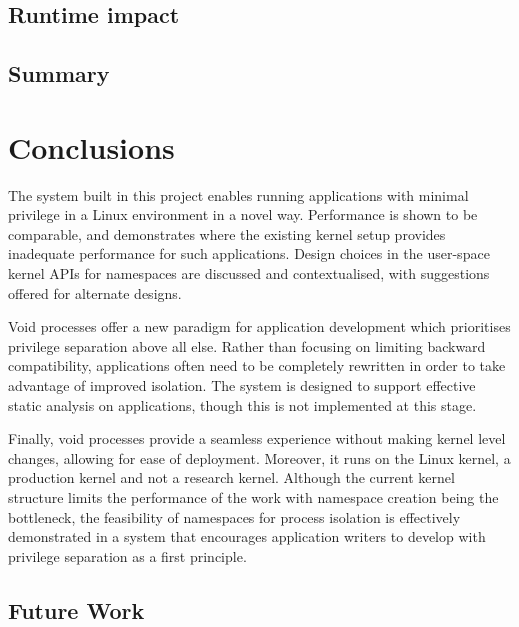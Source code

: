 \documentclass[12pt,a4paper,twoside]{report}
\begin{document}

\section{Runtime impact}
\label{sec:evaluation-applications}


\section{Summary}



\chapter{Conclusions}
\label{chap:conclusions}

The system built in this project enables running applications with minimal privilege in a Linux environment in a novel way. Performance is shown to be comparable, and demonstrates where the existing kernel setup provides inadequate performance for such applications. Design choices in the user-space kernel APIs for namespaces are discussed and contextualised, with suggestions offered for alternate designs.

Void processes offer a new paradigm for application development which prioritises privilege separation above all else. Rather than focusing on limiting backward compatibility, applications often need to be completely rewritten in order to take advantage of improved isolation. The system is designed to support effective static analysis on applications, though this is not implemented at this stage.

Finally, void processes provide a seamless experience without making kernel level changes, allowing for ease of deployment. Moreover, it runs on the Linux kernel, a production kernel and not a research kernel. Although the current kernel structure limits the performance of the work with namespace creation being the bottleneck, the feasibility of namespaces for process isolation is effectively demonstrated in a system that encourages application writers to develop with privilege separation as a first principle.

\section{Future Work}
\label{sec:future-work}
\end{document}
